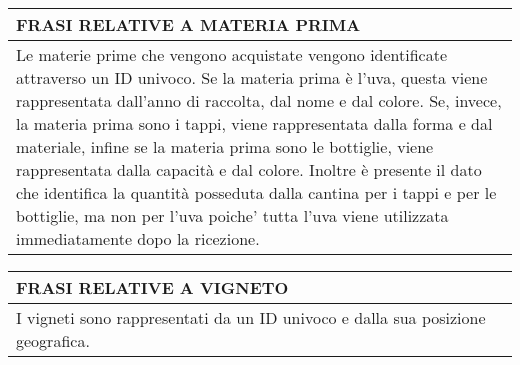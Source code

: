 \begin{center}
	\vspace{0.5cm}

	\begin{tabular}{P{16cm}}
		\toprule
		 \textbf {\large {FRASI RELATIVE A MATERIA PRIMA}}                                                                                                                                                                                                                                                                                                                                                                                                                                                                                                                \\
		\midrule
		Le materie prime che vengono acquistate vengono identificate attraverso un ID univoco. Se la materia prima è l'uva, questa viene rappresentata dall'anno di raccolta, dal nome e dal colore. Se, invece, la materia prima sono i tappi, viene rappresentata dalla forma e dal materiale, infine se la materia prima sono le bottiglie, viene rappresentata dalla capacità e dal colore. Inoltre è presente il dato che identifica la quantità posseduta dalla cantina per i tappi e per le bottiglie, ma non per l'uva poiche' tutta l'uva viene utilizzata immediatamente dopo la ricezione. \\
		\bottomrule
	\end{tabular}

	\vspace{0.5cm}

	\begin{tabular}{P{16cm}}
		\toprule
		 \textbf {\large {FRASI RELATIVE A VIGNETO}}     \\
		\midrule
		I vigneti sono rappresentati da un ID univoco e dalla sua posizione geografica. \\
		\bottomrule
	\end{tabular}

	\vspace{0.5cm}


\end{center}

